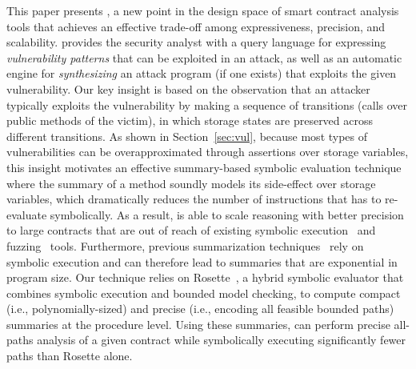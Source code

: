 This paper presents \toolname, a new point in the design space of smart contract analysis tools that achieves an effective trade-off among expressiveness, precision, and scalability. \toolname provides the security analyst with a query language for expressing \emph{vulnerability patterns} 
that can be exploited in an attack, as well as an automatic engine for \emph{synthesizing} an attack program (if one exists) that exploits the given vulnerability. Our key insight is based on the observation that an attacker typically exploits the vulnerability by making a sequence of transitions (calls over public methods of the victim), in which storage states are preserved across different transitions. As shown in Section~\ref{sec:vul}, because most types of vulnerabilities can be overapproximated through assertions over storage variables, this insight motivates an effective summary-based symbolic evaluation technique where the summary of a method soundly models its side-effect over storage variables, which dramatically reduces the number of instructions that \toolname has to re-evaluate symbolically. As a result, \toolname is able to scale reasoning with better precision to large contracts that are out of reach of existing symbolic execution~\cite{teether,oyente} and fuzzing~\cite{contractfuzzer} tools. 
Furthermore, previous summarization techniques~\cite{AnandGT08,Godefroid07} rely on symbolic execution and 
can therefore lead to summaries that are exponential in program size. 
Our technique relies on Rosette~\cite{rosette}, a hybrid symbolic evaluator that combines symbolic execution and bounded model checking, 
to compute compact (i.e., polynomially-sized) and precise (i.e., encoding all feasible bounded paths) summaries at the procedure level. 
Using these summaries, \toolname can perform precise all-paths analysis of 
 a given contract
while symbolically executing significantly fewer paths than Rosette alone.

